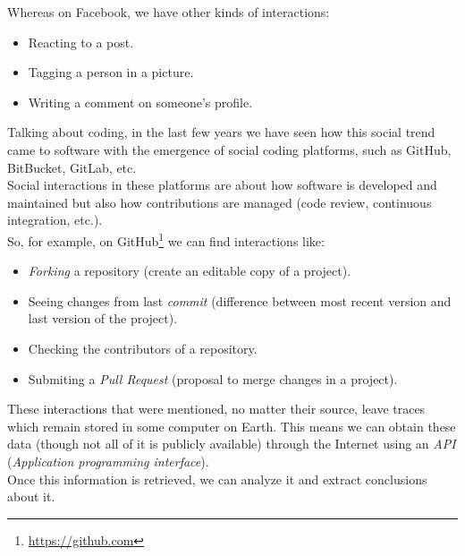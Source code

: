 \documentclass[a4paper, 12pt]{book}
\begin{document}
\pagebreak Whereas on Facebook, we have other kinds of interactions:
\begin{itemize}
    \item Reacting to a post.
    \item Tagging a person in a picture.
    \item Writing a comment on someone's profile.
\end{itemize}
Talking about coding, in the last few years we have seen how this social trend came to software with the
emergence of social coding platforms, such as GitHub, BitBucket, GitLab, etc.\\
Social interactions in these platforms are about how software is developed and maintained but also how
contributions are managed (code review, continuous integration, etc.).\\
So, for example, on GitHub\footnote{\url{https://github.com}} we can find interactions like:
\begin{itemize}
    \item \textit{Forking} a repository (create an editable copy of a project).
    \item Seeing changes from last \textit{commit} (difference between most recent version and last version of the project).
    \item Checking the contributors of a repository.
    \item Submiting a \textit{Pull Request} (proposal to merge changes in a project).
\end{itemize}
These interactions that were mentioned, no matter their source, leave traces which remain stored in some computer on Earth.
This means we can obtain these data (though not all of it is publicly available) through the Internet using an \emph{API}
(\textit{Application programming interface}).\\
Once this information is retrieved, we can analyze it and extract conclusions about it.
\end{document}
